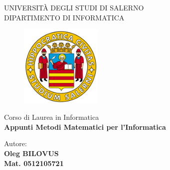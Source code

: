 \begin{titlepage}
    \begin{center}
        \LARGE{\uppercase{Università degli Studi di Salerno}}\\
        \vspace{5mm}
    	\uppercase{\normalsize Dipartimento di Informatica }\\
    \end{center}
    \begin{figure}[H]
        \centering
        \includegraphics[width=0.35\textwidth]{cover/logo_unisa.png}
    \end{figure}
    
    \begin{center}
    	\normalsize{ Corso di Laurea in Informatica }\\
    	\vspace{15mm}
        {\LARGE{\bf Appunti Metodi Matematici per l'Informatica}}\\
    	\vspace{3mm}
    \end{center}
    
    \vspace*{\fill}
    \noindent
    \hfill
    \begin{minipage}[t]{0.4\textwidth}\raggedleft
    	{\large{Autore: \\ \bf {} Oleg BILOVUS \\Mat. 0512105721}}
    \end{minipage}
    
    \vspace*{\fill}
    

\end{titlepage}
